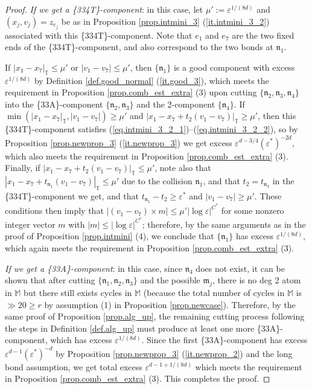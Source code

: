 \documentclass[10pt, reqno]{amsart}
\newcommand{\Mb}{\mathbb M}
\newcommand{\Tb}{\mathbb T}
\newcommand{\mf}{\mathfrak m}
\newcommand{\nf}{\mathfrak n}
\theoremstyle{definition}
\theoremstyle{remark}
\numberwithin{equation}{section}
\begin{document}
\begin{proof}
\emph{If we get a \{334T\}-component}: in this case, let $\mu':=\varepsilon^{1/(8d)}$ and $(x_j,v_j)=z_{e_j}$ be as in Proposition \ref{prop.intmini_3} (\ref{it.intmini_3_2}) associated with this \{334T\}-component. Note that $e_1$ and $e_7$ are the two fixed ends of the \{334T\}-component, and also correspond to the two bonds at $\nf_1$.

If $|x_1-x_7|_\Tb\leq \mu'$ or $|v_1-v_7|\leq \mu'$, then $\{\nf_1\}$ is a good component with excess $\varepsilon^{1/(8d)}$ by Definition \ref{def.good_normal} (\ref{it.good_3}), which meets the requirement in Proposition \ref{prop.comb_est_extra} (3) upon cutting $\{\nf_2,\nf_3,\nf_4\}$ into the \{33A\}-component $\{\nf_2,\nf_3\}$ and the 2-component $\{\nf_4\}$. If $\min(|x_1-x_7|_\Tb,|v_1-v_7|)\geq\mu'$ and $|x_1-x_7+t_2(v_1-v_7)|_\Tb\geq \mu'$, then this \{334T\}-component satisfies (\ref{eq.intmini_3_2_1})--(\ref{eq.intmini_3_2_2}), so by Proposition \ref{prop.newprop_3} (\ref{it.newprop_3}) we get excess $\varepsilon^{d-3/4}(\varepsilon^*)^{-2d}$, which also meets the requirement in Proposition \ref{prop.comb_est_extra} (3). Finally, if $|x_1-x_7+t_2(v_1-v_7)|_\Tb\leq \mu'$, note also that $|x_1-x_7+t_{\nf_1}(v_1-v_7)|_\Tb\leq \mu'$ due to the collision $\nf_1$, and that $t_2=t_{\nf_3}$ in the  \{334T\}-component we get, and that $t_{\nf_1}-t_2\geq\varepsilon^*$ and $|v_1-v_7|\geq\mu'$. These conditions then imply that $|(v_1-v_7)\times m|\leq\mu'|\log\varepsilon|^{C^*}$ for some nonzero integer vector $m$ with $|m|\leq|\log\varepsilon|^{C^*}$; therefore, by the same arguments as in the proof of Proposition \ref{prop.intmini} (4), we conclude that $\{\nf_1\}$ has excess $\varepsilon^{1/(8d)}$, which again meets the requirement in Proposition \ref{prop.comb_est_extra} (3).

\emph{If we get a \{33A\}-component}: in this case, since $\nf_4$ does not exist, it can be shown that after cutting $\{\nf_1,\nf_2,\nf_3\}$ and the possible $\mf_j$, there is no deg 2 atom in $\Mb$ but there still exists cycles in $\Mb$ (because the total number of cycles in $\Mb$ is $\gg 20\geq r$ by assumption (1) in Proposition \ref{prop.newcase}). Therefore, by the same proof of Proposition \ref{prop.alg_up}, the remaining cutting process following the steps in Definition \ref{def.alg_up} must produce at least one more \{33A\}-component, which has excess $\varepsilon^{1/(8d)}$. Since the first \{33A\}-component has excess $\varepsilon^{d-1}(\varepsilon^*)^{-d}$ by Proposition \ref{prop.newprop_3} (\ref{it.newprop_2}) and the long bond assumption, we get total excess $\varepsilon^{d-1+1/(8d)}$ which meets the requirement in Proposition \ref{prop.comb_est_extra} (3). This completes the proof.
\end{proof}
\end{document}

